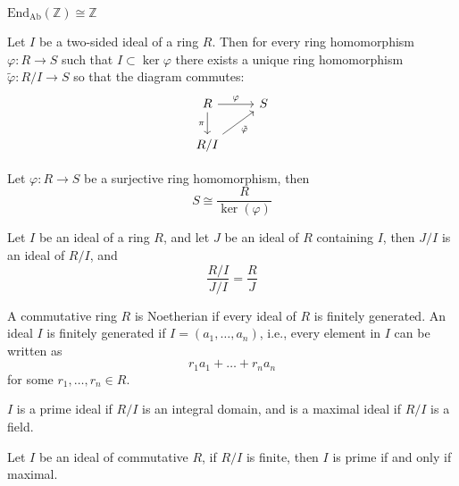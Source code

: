 \documentclass[openany]{book}
\newcommand{\Z}{\mathbb{Z}}
\begin{document}
\begin{prop}
    $\text{End}_{\text{Ab}}(\Z)\cong\Z$
\end{prop}



\begin{thm}
    Let $I$ be a two-sided ideal of a ring $R$. Then for every ring homomorphism $\varphi: R\to S$ such that $I\subset\ker\varphi$ there exists a unique ring homomorphism $\tilde{\varphi}: R/I\to S$ so that the diagram commutes:
    \[\begin{tikzcd}
        R & S \\
        {R/I}
        \arrow["\varphi", from=1-1, to=1-2]
        \arrow["\pi"', from=1-1, to=2-1]
        \arrow["{\tilde{\varphi}}"', from=2-1, to=1-2]
    \end{tikzcd}\]
\end{thm}

\begin{thm}
    Let $\varphi:R\to S$ be a surjective ring homomorphism, then 
    \begin{equation*}
        S\cong\frac{R}{\ker(\varphi)}
    \end{equation*}
\end{thm}


\begin{prop}
    Let $I$ be an ideal of a ring $R$, and let $J$ be an ideal of $R$ containing $I$, then $J/I$ is an ideal of $R/I$, and 
    \begin{equation*}
        \frac{R/I}{J/I}=\frac{R}{J}
    \end{equation*}
\end{prop}


\begin{defn}[Noetherian]
    A commutative ring $R$ is Noetherian if every ideal of $R$ is finitely generated. An ideal $I$ is finitely generated if $I=(a_1,\dots,a_n)$, i.e., every element in $I$ can be written as 
    \begin{equation*}
        r_1a_1+\dots+r_na_n
    \end{equation*}
    for some $r_1,\dots, r_n\in R$.
\end{defn}

\begin{defn}
    $I$ is a prime ideal if $R/I$ is an integral domain, and is a maximal ideal if $R/I$ is a field.
\end{defn}

\begin{prop}
    Let $I$ be an ideal of commutative $R$, if $R/I$ is finite, then $I$ is prime if and only if maximal.
\end{prop}
\end{document}
